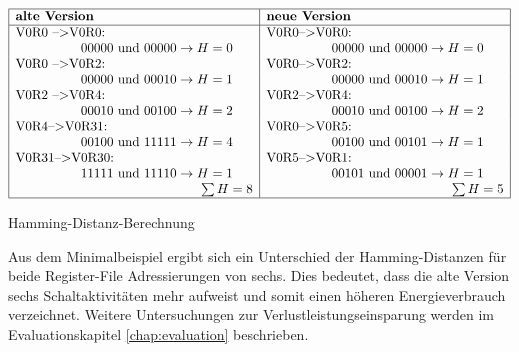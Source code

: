 \begin{table}[H]
	\centering
	$ \begin{array}{|l|l|}
	\hline
	\textbf{alte Version} & \textbf{neue Version} \\
	\hline
	\text{V0R0 -->V0R0: }&\text{V0R0-->V0R0: }\\ 
	\hspace{50pt} 00000 \text{ und } 00000 \rightarrow H= 0 &\hspace{50pt} 00000 \text{ und } 00000 \rightarrow H= 0\\
	\text{V0R0 -->V0R2: } &\text{V0R0-->V0R2: }\\
	\hspace{50pt} 00000 \text{ und } 00010 \rightarrow H= 1 &\hspace{50pt} 00000 \text{ und } 00010 \rightarrow H= 1 \\
	\text{V0R2 -->V0R4: } &\text{V0R2-->V0R4: }\\
	\hspace{50pt} 00010 \text{ und } 00100 \rightarrow H= 2 &\hspace{50pt} 00010 \text{ und } 00100 \rightarrow H= 2 \\
	\text{V0R4-->V0R31: } &\text{V0R0-->V0R5: }\\
	\hspace{50pt} 00100 \text{ und } 11111 \rightarrow H= 4 &\hspace{50pt} 00100 \text{ und } 00101 \rightarrow H= 1 \\
	\text{V0R31-->V0R30: } &\text{V0R5-->V0R1: }\\
	\hspace{50pt} 11111 \text{ und } 11110 \rightarrow H= 1 &\hspace{50pt} 00101 \text{ und } 00001 \rightarrow H= 1 \\
	\hspace{142pt} \sum H=8 &\hspace{142pt}\sum H=5 \\
	\hline
	\end{array} $
	\caption{Hamming-Distanz-Berechnung}
	\label{tab::hamming_distanz}
\end{table}
Aus dem Minimalbeispiel ergibt sich ein Unterschied der Hamming-Distanzen für beide Register-File Adressierungen von sechs. Dies bedeutet, dass die alte Version sechs Schaltaktivitäten mehr aufweist und somit einen höheren Energieverbrauch verzeichnet. Weitere Untersuchungen zur Verlustleistungseinsparung werden im Evaluationskapitel \ref{chap:evaluation} beschrieben.





